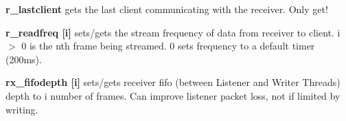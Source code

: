 \begin{DoxyItemize}
\item {\bfseries r\_\-lastclient} gets the last client communicating with the receiver. Only get!
\end{DoxyItemize}


\begin{DoxyItemize}
\item {\bfseries r\_\-readfreq \mbox{[}i\mbox{]}} sets/gets the stream frequency of data from receiver to client. i $>$ 0 is the nth frame being streamed. 0 sets frequency to a default timer (200ms).
\end{DoxyItemize}


\begin{DoxyItemize}
\item {\bfseries rx\_\-fifodepth \mbox{[}i\mbox{]}} sets/gets receiver fifo (between Listener and Writer Threads) depth to i number of frames. Can improve listener packet loss, not if limited by writing. 
\end{DoxyItemize}